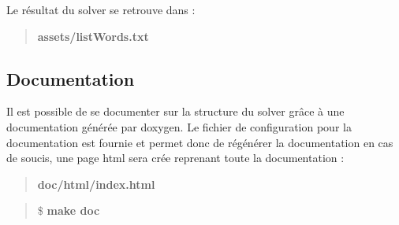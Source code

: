 Le résultat du solver se retrouve dans \+:

\begin{quote}
{\bfseries assets/list\+Words.\+txt} \end{quote}


\subsection*{Documentation}

Il est possible de se documenter sur la structure du solver grâce à une documentation générée par doxygen. Le fichier de configuration pour la documentation est fournie et permet donc de régénérer la documentation en cas de soucis, une page html sera crée reprenant toute la documentation \+:

\begin{quote}
{\bfseries doc/html/index.\+html} \end{quote}


\begin{quote}
\$ {\bfseries make doc}\end{quote}
